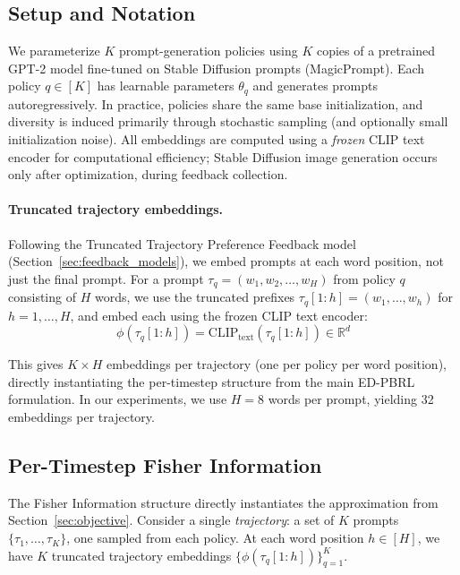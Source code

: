 \documentclass{article}
\begin{document}
\subsection{Setup and Notation}
\label{sec:reinforce:setup}

We parameterize $K$ prompt-generation policies using $K$ copies of a pretrained GPT-2 model fine-tuned on Stable Diffusion prompts (MagicPrompt). Each policy $q \in [K]$ has learnable parameters $\theta_q$ and generates prompts autoregressively. In practice, policies share the same base initialization, and diversity is induced primarily through stochastic sampling (and optionally small initialization noise). All embeddings are computed using a \emph{frozen} CLIP text encoder for computational efficiency; Stable Diffusion image generation occurs only after optimization, during feedback collection.

\paragraph{Truncated trajectory embeddings.}
Following the Truncated Trajectory Preference Feedback model (Section~\ref{sec:feedback_models}), we embed prompts at each word position, not just the final prompt. For a prompt $\tau_q = (w_1, w_2, \ldots, w_H)$ from policy $q$ consisting of $H$ words, we use the truncated prefixes $\tau_q[1:h] = (w_1, \ldots, w_h)$ for $h = 1, \ldots, H$, and embed each using the frozen CLIP text encoder:
\begin{equation}
    \phi(\tau_q[1:h]) = \text{CLIP}_{\text{text}}(\tau_q[1:h]) \in \mathbb{R}^d
\end{equation}

This gives $K \times H$ embeddings per trajectory (one per policy per word position), directly instantiating the per-timestep structure from the main ED-PBRL formulation. In our experiments, we use $H=8$ words per prompt, yielding 32 embeddings per trajectory.

\subsection{Per-Timestep Fisher Information}
\label{sec:reinforce:fisher}

The Fisher Information structure directly instantiates the approximation from Section~\ref{sec:objective}. Consider a single \emph{trajectory}: a set of $K$ prompts $\{\tau_1, \ldots, \tau_K\}$, one sampled from each policy. At each word position $h \in [H]$, we have $K$ truncated trajectory embeddings $\{\phi(\tau_q[1:h])\}_{q=1}^K$.
\end{document}
